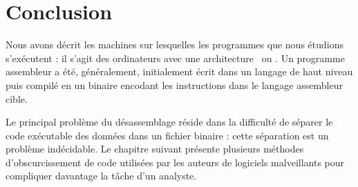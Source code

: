 \section{Conclusion}
Nous avons décrit les machines sur lesquelles les programmes que nous étudions s'exécutent : il s'agit des ordinateurs avec une architecture \xq\ ou \xs.
Un programme assembleur a été, généralement, initialement écrit dans un langage de haut niveau puis compilé en un binaire encodant les instructions dans le langage assembleur cible.

Le principal problème du désassemblage réside dans la difficulté de séparer le code exécutable des données dans un fichier binaire : cette séparation est un problème indécidable.
Le chapitre suivant présente plusieurs méthodes d'obscurcissement de code utilisées par les auteurs de logiciels malveillants pour compliquer davantage la tâche d'un analyste.
